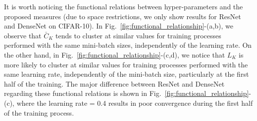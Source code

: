 \documentclass[10pt,journal,compsoc]{IEEEtran}
\begin{document}
It is worth noticing the functional relations between hyper-parameters and the proposed measures (due to space restrictions, we only show results for ResNet and DenseNet on CIFAR-10). In Fig.~\ref{fig:functional_relationship}-(a,b), we observe that $\bar C_K$ tends to cluster at similar values for training processes performed with the same mini-batch sizes, independently of the learning rate.
On the other hand, in Fig.~\ref{fig:functional_relationship}-(c,d), we notice that $L_K$ is more likely to cluster at similar values for training processes performed with the same learning rate, independently of the mini-batch size, particularly at the first half of the training.
The major difference between ResNet and DenseNet regarding these functional relations is shown in Fig.~\ref{fig:functional_relationship}-(c), where the learning rate = 0.4 results in poor convergence during the first half of the training process.

\begin{figure*}
\begin{center}
\end{center}
\caption{The proposed measurements $\bar C_K$ (a,b) and $L_K$ (c,d) for the training of the ResNet (a,c) and DenseNet (b,d) on CIFAR-10, as a function of the number of training iterations (instead of epochs).
The black dotted vertical lines indicate the last iterations for the respective experiments with the same batch size (the results of $s\{8,512\}$ are excluded to avoid a cluttered presentation).  
}
\label{fig:functional_relationship}
\end{figure*}
\end{document}

